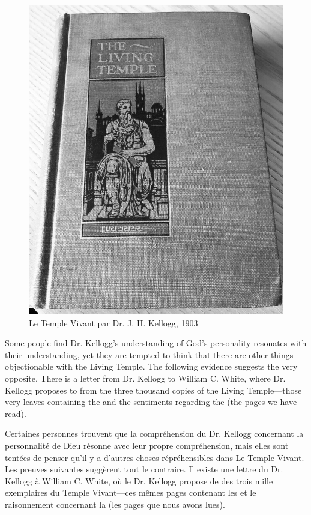 \begin{figure}[hp]
    \centering
    \includegraphics[width=1\linewidth]{images/TLT.jpg}
    \caption*{Le Temple Vivant par Dr. J. H. Kellogg, 1903}
    \label{fig:tlt}
\end{figure}


Some people find Dr. Kellogg’s understanding of God’s personality resonates with their understanding, yet they are tempted to think that there are other things objectionable with the Living Temple. The following evidence suggests the very opposite. There is a letter from Dr. Kellogg to William C. White, where Dr. Kellogg proposes to  from the three thousand copies of the Living Temple—those very leaves containing the  and the sentiments regarding the  (the pages we have read).


Certaines personnes trouvent que la compréhension du Dr. Kellogg concernant la personnalité de Dieu résonne avec leur propre compréhension, mais elles sont tentées de penser qu'il y a d'autres choses répréhensibles dans Le Temple Vivant. Les preuves suivantes suggèrent tout le contraire. Il existe une lettre du Dr. Kellogg à William C. White, où le Dr. Kellogg propose de  des trois mille exemplaires du Temple Vivant—ces mêmes pages contenant les  et le raisonnement concernant la  (les pages que nous avons lues).


